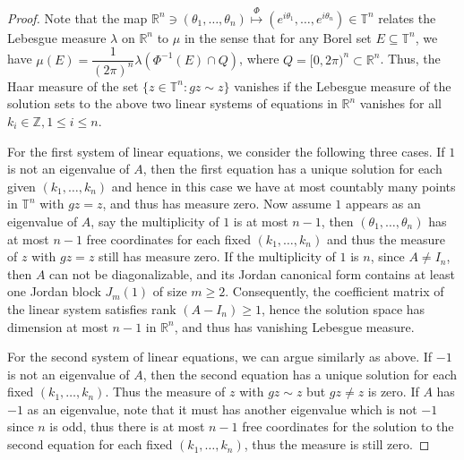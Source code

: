 \documentclass[12pt]{amsart}
\theoremstyle{definition}
\theoremstyle{remark}
\begin{document}
\begin{proof}
Note that the map $\mathbb{R}^n\ni(\theta_1,\ldots,\theta_n)\overset{\Phi}{\mapsto} (e^{i\theta_1},\ldots,e^{i\theta_n})\in\mathbb{T}^n$ relates the Lebesgue measure $\lambda$ on $\mathbb{R}^n$ to $\mu$ in the sense that for any Borel set $E\subseteq \mathbb{T}^n$, we have $\mu(E)=\dfrac{1}{(2\pi)^n} \lambda(\Phi^{-1}(E)\cap Q)$, where $Q=[0,2\pi)^n\subset\mathbb{R}^n$. Thus, the Haar measure of the set $\{z\in \mathbb{T}^{n}:gz\sim z\}$ vanishes if the Lebesgue measure of the solution sets to the above two linear systems of equations in $\mathbb{R}^n$ vanishes for all $k_i\in\mathbb{Z}, 1\leq i\leq n$.

For the first system of linear equations, we consider the following three cases. If $1$ is not an eigenvalue of $A$, then the first equation has a unique solution for each given $(k_1,\dots,k_n)$ and hence in this case we have at most countably many points in $\mathbb{T}^n$ with $gz=z$, and thus has measure zero. Now assume $1$ appears as an eigenvalue of $A$, say the multiplicity of $1$ is at most $n-1$, then $(\theta_1,\dots,\theta_n)$ has at most $n-1$  free coordinates for each fixed $(k_1,\dots,k_n)$ and thus the measure of $z$ with $gz=z$
still has measure zero. If the multiplicity of $1$ is $n$, since $A\ne I_n$, then $A$ can not be diagonalizable, and its Jordan canonical form contains at least one Jordan block $J_{m}(1)$ of size $m\ge 2$. Consequently, the coefficient matrix of the linear system satisfies rank $(A-I_n)\ge1$, hence the solution space has dimension at most $n-1$ in $\mathbb{R}^n$, and thus has vanishing Lebesgue measure.

For the second system of linear equations, we can argue similarly as above. If $-1$ is not an eigenvalue of $A$, then the second equation has a unique solution for each fixed $(k_1,\ldots,k_n)$. Thus the measure of $z$ with $gz \sim z$ but $gz\ne z$ is zero. If $A$ has $-1$ as an eigenvalue, note that it must has another eigenvalue which is not $-1$ since $n$ is odd, thus there is at most $n-1$ free coordinates for the solution to the second equation for each fixed $(k_1,\ldots,k_n)$, thus the measure is still zero.
\end{proof}
\end{document}
